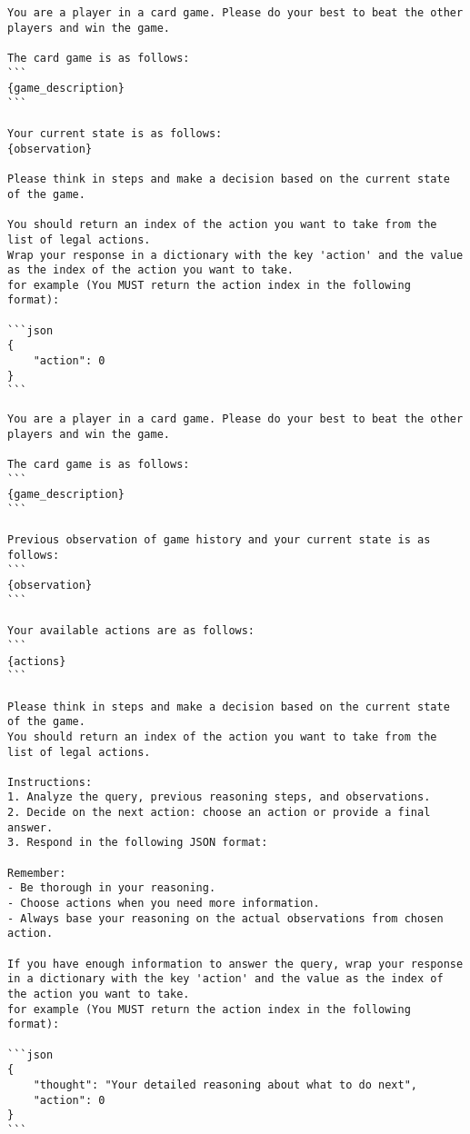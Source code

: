 \begin{tcolorbox}[
breakable,
title=Game-play Prompt for Chain-of-thought Agent,  
colframe=promptcolor, 
colback=white,
]
\begin{lstlisting}[]
You are a player in a card game. Please do your best to beat the other players and win the game.

The card game is as follows:
```
{game_description}
```

Your current state is as follows:
{observation}

Please think in steps and make a decision based on the current state of the game.

You should return an index of the action you want to take from the list of legal actions.
Wrap your response in a dictionary with the key 'action' and the value as the index of the action you want to take.
for example (You MUST return the action index in the following format):

```json
{
    "action": 0
}
```
\end{lstlisting}
\end{tcolorbox}


\begin{tcolorbox}[
breakable,
title=Game-play Prompt for ReAct Agent,  
colframe=promptcolor, 
colback=white,
]
\begin{lstlisting}[]
You are a player in a card game. Please do your best to beat the other players and win the game.

The card game is as follows:
```
{game_description}
```

Previous observation of game history and your current state is as follows:
```
{observation}
```

Your available actions are as follows:
```
{actions}
```

Please think in steps and make a decision based on the current state of the game.
You should return an index of the action you want to take from the list of legal actions.

Instructions:
1. Analyze the query, previous reasoning steps, and observations.
2. Decide on the next action: choose an action or provide a final answer.
3. Respond in the following JSON format:

Remember:
- Be thorough in your reasoning.
- Choose actions when you need more information.
- Always base your reasoning on the actual observations from chosen action.

If you have enough information to answer the query, wrap your response in a dictionary with the key 'action' and the value as the index of the action you want to take.
for example (You MUST return the action index in the following format):

```json
{
    "thought": "Your detailed reasoning about what to do next",
    "action": 0
}
```
\end{lstlisting}
\end{tcolorbox}


